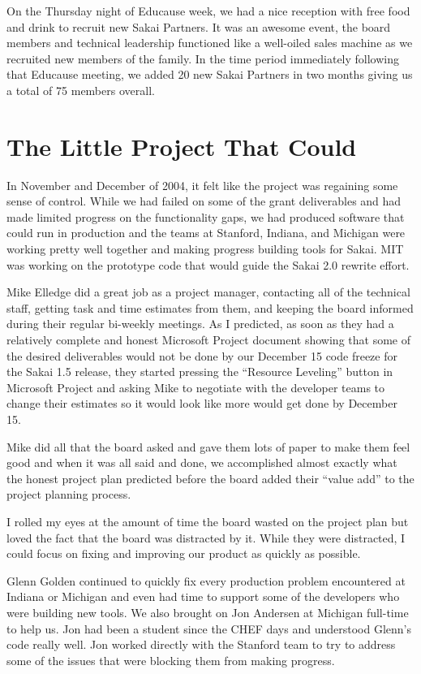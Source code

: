 \documentclass[12pt]{book}
\begin{document}
On the Thursday night of Educause week, we had a nice
reception with free food and drink to recruit
new Sakai Partners.  It was an awesome event, the
board members and technical leadership functioned like a
well-oiled sales machine as we recruited new members
of the family.
In the time period immediately following that Educause
meeting, we added 20 new Sakai Partners in two months
giving us a total of 75 members overall.

\chapter{The Little Project That Could}

In November and December of 2004, it felt like the project
was regaining some sense of control.  While we had failed
on some of the grant deliverables and had made
limited progress on the functionality gaps, we had
produced software that could run in production and the
teams at Stanford, Indiana, and Michigan were working
pretty well together and making progress building
tools for Sakai. MIT was working on the prototype code
that would guide the Sakai 2.0 rewrite effort.

Mike Elledge did a great job as a project manager,
contacting all of the technical staff,
getting task and time estimates from them, and
keeping the board informed during their regular
bi-weekly meetings.  As I predicted, as
soon as they had a relatively complete and honest
Microsoft Project document showing that
some of the desired deliverables would not be done
by our December 15 code freeze for the Sakai 1.5
release, they started pressing the ``Resource
Leveling'' button in Microsoft Project and asking
Mike to negotiate with the developer teams to
change their estimates so it would look like
more would get done by December 15.

Mike did all that the board asked and gave
them lots of paper to make them feel good and
when it was all said and done, we accomplished
almost exactly what the honest project plan
predicted before the board added their
``value add'' to the project planning process.

I rolled my eyes at the amount of time the board
wasted on the project plan but loved the fact that
the board was distracted by it.  While they were
distracted, I could focus on fixing
and improving our product as quickly as possible.

Glenn Golden continued to quickly fix every production
problem encountered at Indiana or Michigan and
even had time to support some of the developers who
were building new tools.  We also brought on
Jon Andersen at Michigan full-time to help us.
Jon had been a student since the CHEF days
and understood Glenn's code really well.
Jon worked directly with the Stanford
team to try to address some of the issues
that were blocking them from making progress.
\end{document}
